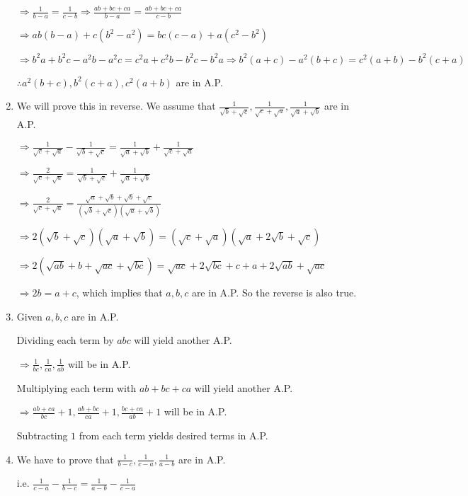 \begin{enumerate}
  $\Rightarrow \frac{1}{b - a} = \frac{1}{c - b} \Rightarrow \frac{ab + bc + ca}{b - a} = \frac{ab + bc + ca}{c - b}$

  $\Rightarrow ab(b - a) + c(b^2 - a^2) = bc(c - a) + a(c^2 - b^2)$

  $\Rightarrow b^2a + b^2c - a^2b - a^2c = c^2a + c^2b - b^2c - b^2a \Rightarrow b^2(a + c) - a^2(b + c) = c^2(a + b) - b^2(c + a)$

  $\therefore a^2(b + c), b^2(c + a), c^2(a + b)$ are in A.P.
\item We will prove this in reverse. We assume that $\frac{1}{\sqrt{b} + \sqrt{c}}, \frac{1}{\sqrt{c} + \sqrt{a}},
  \frac{1}{\sqrt{a} + \sqrt{b}}$ are in A.P.

  $\Rightarrow \frac{1}{\sqrt{c} + \sqrt{a}} - \frac{1}{\sqrt{b} + \sqrt{c}} = \frac{1}{\sqrt{a} + \sqrt{b}} +
  \frac{1}{\sqrt{c} + \sqrt{a}}$

  $\Rightarrow \frac{2}{\sqrt{c} + \sqrt{a}} = \frac{1}{\sqrt{b} + \sqrt{c}} + \frac{1}{\sqrt{a} + \sqrt{b}}$

  $\Rightarrow \frac{2}{\sqrt{c} + \sqrt{a}} = \frac{\sqrt{a} + \sqrt{b} + \sqrt{b} + \sqrt{c}}{(\sqrt{b} + \sqrt{c})(\sqrt{a}
    + \sqrt{b})}$

  $\Rightarrow 2(\sqrt{b} + \sqrt{c})(\sqrt{a} + \sqrt{b}) = (\sqrt{c} + \sqrt{a})(\sqrt{a} + 2\sqrt{b} + \sqrt{c})$

  $\Rightarrow 2(\sqrt{ab} + b + \sqrt{ac} + \sqrt{bc}) = \sqrt{ac} + 2\sqrt{bc} + c + a + 2\sqrt{ab} + \sqrt{ac}$

  $\Rightarrow 2b = a + c$, which implies that $a, b, c$ are in A.P. So the reverse is also true.
\item Given $a, b, c$ are in A.P.

  Dividing each term by $abc$ will yield another A.P.

  $\Rightarrow \frac{1}{bc}, \frac{1}{ca}, \frac{1}{ab}$ will be in A.P.

  Multiplying each term with $ab + bc + ca$ will yield another A.P.

  $\Rightarrow \frac{ab + ca}{bc} + 1, \frac{ab + bc}{ca} + 1, \frac{bc + ca}{ab} + 1$ will be in A.P.

  Subtracting $1$ from each term yields desired terms in A.P.
\item We have to prove that $\frac{1}{b - c}, \frac{1}{c - a}, \frac{1}{a - b}$ are in A.P.

  i.e. $\frac{1}{c - a} - \frac{1}{b - c} = \frac{1}{a - b} - \frac{1}{c - a}$


\end{enumerate}
